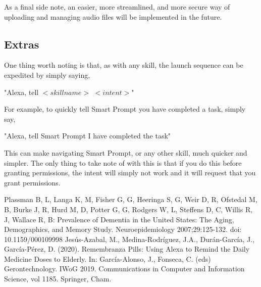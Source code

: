 \documentclass[11pt, oneside]{article}
\begin{document}
As a final side note, an easier, more streamlined, and more secure way of uploading and managing audio files will be implemented in the future.

\subsection{Extras}

One thing worth noting is that, as with any skill, the launch sequence can be expedited by simply saying,
\begin{center}
"Alexa, tell $<skill name>$ $<intent>$"
\end{center}
For example, to quickly tell Smart Prompt you have completed a task, simply say,
\begin{center}
"Alexa, tell Smart Prompt I have completed the task"
\end{center}
This can make navigating Smart Prompt, or any other skill, much quicker and simpler. The only thing to take note of with this is that if you do this before granting permissions, the intent will simply not work and it will request that you grant permissions.

\begin{thebibliography}{00}
 Plassman B, L, Langa K, M, Fisher G, G, Heeringa S, G, Weir D, R, Ofstedal M, B, Burke J, R, Hurd M, D, Potter G, G, Rodgers W, L, Steffens D, C, Willis R, J, Wallace R, B: Prevalence of Dementia in the United States: The Aging, Demographics, and Memory Study. Neuroepidemiology 2007;29:125-132. doi: 10.1159/000109998
 Jesús-Azabal, M., Medina-Rodríguez, J.A., Durán-García, J., García-Pérez, D. (2020). Remembranza Pills: Using Alexa to Remind the Daily Medicine Doses to Elderly. In: García-Alonso, J., Fonseca, C. (eds) Gerontechnology. IWoG 2019. Communications in Computer and Information Science, vol 1185. Springer, Cham. 
\end{thebibliography}
\end{document}
